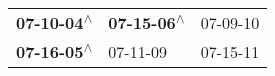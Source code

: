 \begin{supertabular}{lll}
 \textbf{07-10-04\textsuperscript{$\wedge$}} &  \textbf{07-15-06\textsuperscript{$\wedge$}} &  07-09-10\textsuperscript{} \\
 \textbf{07-16-05\textsuperscript{$\wedge$}} &                   07-11-09\textsuperscript{} &  07-15-11\textsuperscript{} \\
\end{supertabular}
